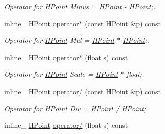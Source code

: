 \begin{DoxyCompactItemize}
\begin{DoxyCompactList}\small\item\em Operator for \hyperlink{class_h_point}{H\+Point} Minus = \hyperlink{class_h_point}{H\+Point} -\/ \hyperlink{class_h_point}{H\+Point};. \end{DoxyCompactList}\item 
\hypertarget{class_h_point_a1d954b99cecbb6b9fb70f2eca41aede7}{inline\+\_\+ \hyperlink{class_h_point}{H\+Point} \hyperlink{class_h_point_a1d954b99cecbb6b9fb70f2eca41aede7}{operator$\ast$} (const \hyperlink{class_h_point}{H\+Point} \&p) const }\label{class_h_point_a1d954b99cecbb6b9fb70f2eca41aede7}

\begin{DoxyCompactList}\small\item\em Operator for \hyperlink{class_h_point}{H\+Point} Mul = \hyperlink{class_h_point}{H\+Point} $\ast$ \hyperlink{class_h_point}{H\+Point};. \end{DoxyCompactList}\item 
\hypertarget{class_h_point_a03246f811237b5e1a65fc306495140cd}{inline\+\_\+ \hyperlink{class_h_point}{H\+Point} \hyperlink{class_h_point_a03246f811237b5e1a65fc306495140cd}{operator$\ast$} (float s) const }\label{class_h_point_a03246f811237b5e1a65fc306495140cd}

\begin{DoxyCompactList}\small\item\em Operator for \hyperlink{class_h_point}{H\+Point} Scale = \hyperlink{class_h_point}{H\+Point} $\ast$ float;. \end{DoxyCompactList}\item 
\hypertarget{class_h_point_ae8f7600571fcc3b22eca98339163fbd6}{inline\+\_\+ \hyperlink{class_h_point}{H\+Point} \hyperlink{class_h_point_ae8f7600571fcc3b22eca98339163fbd6}{operator/} (const \hyperlink{class_h_point}{H\+Point} \&p) const }\label{class_h_point_ae8f7600571fcc3b22eca98339163fbd6}

\begin{DoxyCompactList}\small\item\em Operator for \hyperlink{class_h_point}{H\+Point} Div = \hyperlink{class_h_point}{H\+Point} / \hyperlink{class_h_point}{H\+Point};. \end{DoxyCompactList}\item 
\hypertarget{class_h_point_a3dbf22e6d49a939c8ab717766fa73f26}{inline\+\_\+ \hyperlink{class_h_point}{H\+Point} \hyperlink{class_h_point_a3dbf22e6d49a939c8ab717766fa73f26}{operator/} (float s) const }\label{class_h_point_a3dbf22e6d49a939c8ab717766fa73f26}


\end{DoxyCompactItemize}
